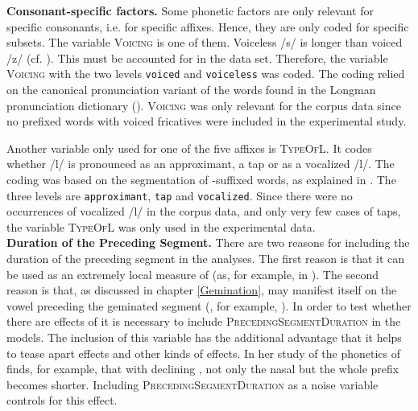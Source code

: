 \textbf{Consonant-specific factors.} Some phonetic factors are only relevant for specific consonants, i.e. for specific affixes. Hence, they are only coded for specific subsets. The variable \textsc{Voicing} is one of them. Voiceless /s/ is longer than voiced /z/ (cf. \citealt{Umeda.1977}). This must be accounted for in the data set. Therefore, the variable \textsc{Voicing} with the two levels \texttt{voiced} and \texttt{voiceless} was coded. The coding relied on the canonical pronunciation variant of the words found in the Longman pronunciation dictionary (\citealt{Wells.2008}). \textsc{Voicing} was only relevant for the corpus data since no prefixed words with voiced fricatives were included in the experimental study.

Another variable only used for one of the five affixes is \textsc{TypeOfL}. It codes whether /l/ is pronounced as an approximant, a tap or as a vocalized /l/. The coding was based on the segmentation of -suffixed words, as explained in . The three levels are \texttt{approximant}, \texttt{tap} and \texttt{vocalized}.  Since there were no occurrences of vocalized /l/ in the corpus data, and only very few cases of taps, the variable \textsc{TypeOfL} was only used in the experimental data.\\


\textbf{Duration of the Preceding Segment.} There are two reasons for including the duration of the preceding segment in the analyses. The first reason is that it can be used as an extremely local measure of  (as, for example, in \citealt{Ernestus.2006}). The second reason is that, as discussed in chapter \ref{Gemination},  may manifest itself on the vowel preceding the geminated segment (, for example, \citealt{Ridouane.2010, Miller.1987, Oh.2012}). In order to test whether there are effects of  it is necessary to include \textsc{PrecedingSegmentDuration} in the models. The inclusion of this variable has the additional advantage that it helps to tease apart  effects and other kinds of  effects. In her study of the phonetics of  \cite{Hay.2007} finds, for example, that with declining ,  not only the nasal but the whole prefix becomes shorter. Including \textsc{PrecedingSegmentDuration} as a noise variable controls for this effect. \\


